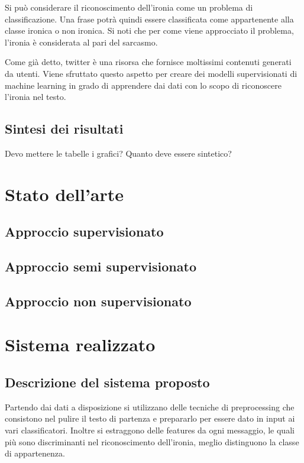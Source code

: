 \documentclass[oneside]{book}
\begin{document}
Si può considerare il riconoscimento dell'ironia come un problema di classificazione. Una frase potrà quindi essere classificata come appartenente alla classe ironica o non ironica. Si noti che per come viene approcciato il problema, l'ironia è considerata al pari del sarcasmo.

Come già detto, twitter è una risorsa che fornisce moltissimi contenuti generati da utenti. Viene sfruttato questo aspetto per creare dei modelli supervisionati di machine learning in grado di apprendere dai dati con lo scopo di riconoscere l'ironia nel testo.



\section*{Sintesi dei risultati}
Devo mettere le tabelle i grafici? Quanto deve essere sintetico?


\chapter{Stato dell'arte}

\section{Approccio supervisionato}

\section{Approccio semi supervisionato}

\section{Approccio non supervisionato}


\chapter{Sistema realizzato}

\section{Descrizione del sistema proposto}
Partendo dai dati a disposizione si utilizzano delle tecniche di preprocessing che consistono nel pulire il testo di partenza e prepararlo per essere dato in input ai vari classificatori. Inoltre si estraggono delle features da ogni messaggio, le quali più sono discriminanti nel riconoscimento dell'ironia, meglio distinguono la classe di appartenenza.
\end{document}
